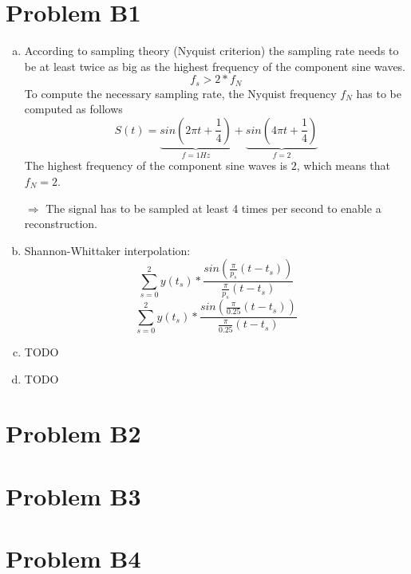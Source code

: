 \documentclass[12pt]{article}
\begin{document}
\lstset{language=C++}


\section*{Problem B1}
\begin{enumerate}[a)]
	\item According to sampling theory (Nyquist criterion) the sampling rate needs to be at least twice as big as the highest frequency of the component sine waves.
	$$ f_s > 2 * f_N$$
	To compute the necessary sampling rate, the Nyquist frequency $f_N$ has to be computed as follows
	$$ S(t) = \underbrace{sin(2\pi t + \frac{1}{4})}_{f = 1Hz} + \underbrace{sin(4\pi t + \frac{1}{4})}_{f = 2}$$
	The highest frequency of the component sine waves is $2$, which means that $f_N = 2$.
	
	$\Rightarrow$ The signal has to be sampled at least 4 times per second to enable a reconstruction.
	
	\item Shannon-Whittaker interpolation:
	$$\sum_{s=0}^{2} y(t_s) * \frac{sin(\frac{\pi}{p_s}(t-t_s))}{\frac{\pi}{p_s}(t-t_s)}$$
	$$\sum_{s=0}^{2} y(t_s) * \frac{sin(\frac{\pi}{0.25}(t-t_s))}{\frac{\pi}{0.25}(t-t_s)}$$
	
	\item TODO
	
	\item TODO
	
\end{enumerate}


\section*{Problem B2}


\section*{Problem B3}


\section*{Problem B4}
\end{document}
